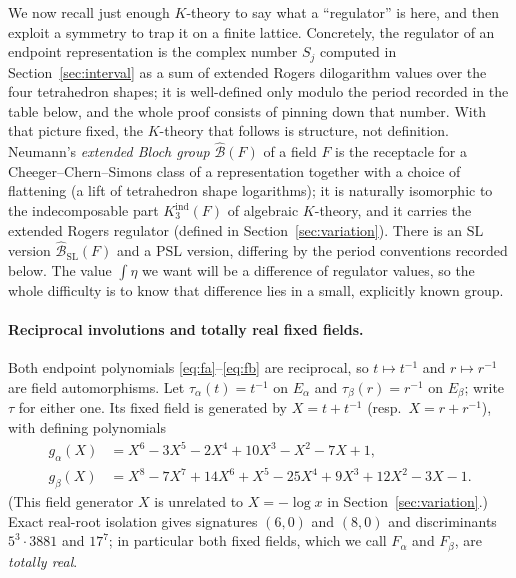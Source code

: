 \documentclass[11pt]{article}
\theoremstyle{definition}
\newcommand{\SL}{\mathrm{SL}}
\newcommand{\PSL}{\mathrm{PSL}}
\newcommand{\Kind}{K_3^{\mathrm{ind}}}
\begin{document}
We now recall just enough $K$-theory to say what a ``regulator'' is here, and
then exploit a symmetry to trap it on a finite lattice.  Concretely, the
regulator of an endpoint representation is the complex number $S_j$ computed in
Section~\ref{sec:interval} as a sum of extended Rogers dilogarithm values over
the four tetrahedron shapes; it is well-defined only modulo the period recorded
in the table below, and the whole proof consists of pinning down that number.
With that picture fixed, the $K$-theory that follows is structure, not
definition.  Neumann's
\emph{extended Bloch group} $\widehat{\mathcal B}(F)$ of a field $F$ is the
receptacle for a Cheeger--Chern--Simons class of a representation together with a
choice of flattening (a lift of tetrahedron shape logarithms); it is naturally
isomorphic to the indecomposable part $\Kind(F)$ of algebraic $K$-theory, and it
carries the extended Rogers regulator (defined in Section~\ref{sec:variation}).
There is an $\SL$ version $\widehat{\mathcal B}_{\SL}(F)$ and a $\PSL$ version,
differing by the period conventions recorded below.  The value $\int\eta$ we
want will be a difference of regulator values, so the whole difficulty is to
know that difference lies in a small, explicitly known group.

\paragraph{Reciprocal involutions and totally real fixed fields.}
Both endpoint polynomials \eqref{eq:fa}--\eqref{eq:fb} are reciprocal, so
$t\mapsto t^{-1}$ and $r\mapsto r^{-1}$ are field automorphisms.  Let
$\tau_\alpha(t)=t^{-1}$ on $E_\alpha$ and $\tau_\beta(r)=r^{-1}$ on $E_\beta$;
write $\tau$ for either one.  Its fixed field is generated by $X=t+t^{-1}$
(resp.\ $X=r+r^{-1}$), with defining polynomials
\begin{align}
 g_\alpha(X)&=X^6-3X^5-2X^4+10X^3-X^2-7X+1,\label{eq:ga}\\
 g_\beta(X)&=X^8-7X^7+14X^6+X^5-25X^4+9X^3+12X^2-3X-1.\label{eq:gb}
\end{align}
(This field generator $X$ is unrelated to $X=-\log x$ in
Section~\ref{sec:variation}.)  Exact real-root isolation gives signatures
$(6,0)$ and $(8,0)$ and discriminants $5^3\cdot3881$ and $17^7$; in particular
both fixed fields, which we call $F_\alpha$ and $F_\beta$, are \emph{totally
real}.
\end{document}
